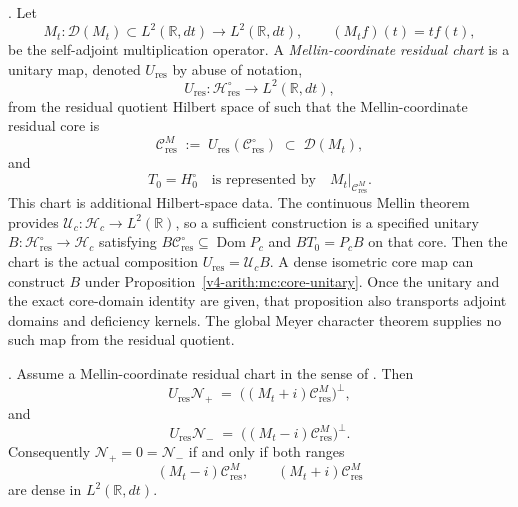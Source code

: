 \begin{definition}
\label{v4-arith:w9-r4:def:meyer-coordinate-core}
\ClaimStatusDefinitional. Let
\[
M_{t}\colon \mathcal{D}(M_{t})\subset L^{2}(\mathbb{R},dt)\to
L^{2}(\mathbb{R},dt),\qquad (M_{t}f)(t)=t f(t),
\]
be the self-adjoint multiplication operator. A \emph{Mellin-coordinate
residual chart} is a unitary map, denoted \(U_{\mathrm{res}}\) by
abuse of notation,
\[
U_{\mathrm{res}}\colon\mathcal{H}_{\mathrm{res}}^{\circ}
\longrightarrow L^{2}(\mathbb{R},dt),
\]
from the residual quotient Hilbert space of
 such that the
Mellin-coordinate residual core is
\begin{equation}
\label{v4-arith:w9-r4:eq:meyer-coordinate-core}
\mathcal{C}_{\mathrm{res}}^{M}
\;:=\;
U_{\mathrm{res}}(\mathcal{C}_{\mathrm{res}}^{\circ})
\;\subset\;
\mathcal{D}(M_{t}),
\end{equation}
and
\[
T_{0}=H_{0}^{\circ}
\quad\text{is represented by}\quad
M_{t}|_{\mathcal{C}_{\mathrm{res}}^{M}} .
\]
This chart is additional Hilbert-space data. The continuous
Mellin theorem provides $\mathcal U_c:\mathscr H_c\to L^2(\mathbb R)$,
so a sufficient construction is a specified unitary
$B:\mathcal H_{\mathrm{res}}^\circ\to\mathscr H_c$ satisfying
$B\mathcal C_{\mathrm{res}}^\circ\subseteq\operatorname{Dom}P_c$
and $BT_0=P_cB$ on that core. Then the chart is the actual composition
$U_{\mathrm{res}}=\mathcal U_cB$.
A dense isometric core map can construct $B$ under
Proposition~\ref{v4-arith:mc:core-unitary}. Once the unitary and
the exact core-domain identity are given, that proposition also
transports adjoint domains and deficiency kernels. The global
Meyer character theorem supplies no such map from the residual quotient.
\end{definition}

\begin{theorem}
\label{v4-arith:w9-r4:thm:deficiency-range-defect}
\ClaimStatusProvedHereConditional. Assume a Mellin-coordinate residual chart in
the sense of . Then
\begin{equation}
\label{v4-arith:w9-r4:eq:deficiency-range-defect-plus}
U_{\mathrm{res}}\mathcal{N}_{+}
\;=\;
\bigl((M_{t}+i)\mathcal{C}_{\mathrm{res}}^{M}\bigr)^{\perp},
\end{equation}
and
\begin{equation}
\label{v4-arith:w9-r4:eq:deficiency-range-defect-minus}
U_{\mathrm{res}}\mathcal{N}_{-}
\;=\;
\bigl((M_{t}-i)\mathcal{C}_{\mathrm{res}}^{M}\bigr)^{\perp}.
\end{equation}
Consequently \(\mathcal{N}_{+}=0=\mathcal{N}_{-}\) if and only if
both ranges
\[
(M_{t}-i)\mathcal{C}_{\mathrm{res}}^{M},
\qquad
(M_{t}+i)\mathcal{C}_{\mathrm{res}}^{M}
\]
are dense in \(L^{2}(\mathbb{R},dt)\).
\end{theorem}

